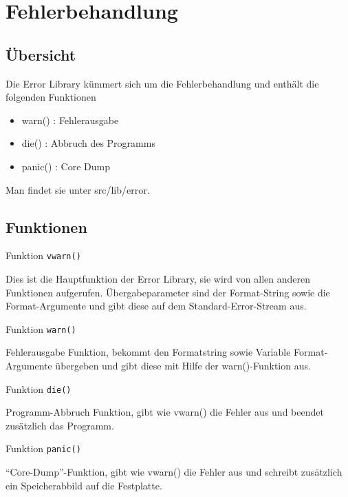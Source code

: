 \chapter{Fehlerbehandlung}
\label{chap:error}

\section{Übersicht}
\label{sec:error_overview}
Die Error Library kümmert sich um die Fehlerbehandlung und enthält die folgenden Funktionen

\begin{itemize}
	\item warn() 	: Fehlerausgabe
	\item die()  	: Abbruch des Programms
	\item panic()	: Core Dump
\end{itemize}

Man findet sie unter src/lib/error.

\section{Funktionen}
\label{sec:error_functions}

Funktion \texttt{vwarn()}

Dies ist die Hauptfunktion der Error Library, sie wird von allen anderen Funktionen aufgerufen.
Übergabeparameter sind der Format-String sowie die Format-Argumente und gibt diese auf dem Standard-Error-Stream aus.

Funktion \texttt{warn()}

Fehlerausgabe Funktion, bekommt den Formatstring sowie Variable Format-Argumente übergeben und gibt diese mit Hilfe der warn()-Funktion aus.

Funktion \texttt{die()}

Programm-Abbruch Funktion, gibt wie vwarn() die Fehler aus und beendet zusätzlich das Programm.

Funktion \texttt{panic()}

``Core-Dump''-Funktion, gibt wie vwarn() die Fehler aus und schreibt zusätzlich ein Speicherabbild auf die Festplatte.



